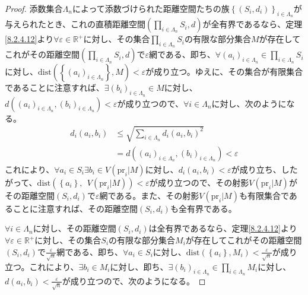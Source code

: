 \documentclass[dvipdfmx]{jsarticle}
\begin{document}
\begin{proof}
添数集合$\varLambda_{n}$によって添数づけられた距離空間たちの族$\left\{ \left( S_{i},d_{i} \right) \right\}_{i \in \varLambda_{n}}$が与えられたとき、これの直積距離空間$\left( \prod_{i \in \varLambda_{n}} S_{i},d \right)$が全有界であるなら、定理\ref{8.2.4.12}より$\forall\varepsilon \in \mathbb{R}^{+}$に対し、その集合$\prod_{i \in \varLambda_{n}} S_{i}$の有限な部分集合$M$が存在してこれがその距離空間$\left( \prod_{i \in \varLambda_{n}} S_{i},d \right)$で$\varepsilon$網である、即ち、$\forall\left( a_{i} \right)_{i \in \varLambda_{n}} \in \prod_{i \in \varLambda_{n}} S_{i}$に対し、$\mathrm{dist}\left( \left\{ \left( a_{i} \right)_{i \in \varLambda_{n}} \right\},M \right) < \varepsilon$が成り立つ。ゆえに、その集合が有限集合であることに注意すれば、$\exists\left( b_{i} \right)_{i \in \varLambda_{n}} \in M$に対し、$d\left( \left( a_{i} \right)_{i \in \varLambda_{n}},\left( b_{i} \right)_{i \in \varLambda_{n}} \right) < \varepsilon$が成り立つので、$\forall i \in \varLambda_{n}$に対し、次のようになる。
\begin{align*}
d_{i}\left( a_{i},b_{i} \right) &\leq \sqrt{\sum_{i \in \varLambda_{n}} {d_{i}\left( a_{i},b_{i} \right)}^{2}}\\
&= d\left( \left( a_{i} \right)_{i \in \varLambda_{n}},\left( b_{i} \right)_{i \in \varLambda_{n}} \right) < \varepsilon
\end{align*}
これにより、$\forall a_{i} \in S_{i}\exists b_{i} \in V\left( {\mathrm{pr}}_{i}|M \right)$に対し、$d_{i}\left( a_{i},b_{i} \right) < \varepsilon$が成り立ち、したがって、$\mathrm{dist}\left( \left\{ a_{i} \right\},\ \ V\left( {\mathrm{pr}}_{i}|M \right) \right) < \varepsilon$が成り立つので、その射影$V\left( {\mathrm{pr}}_{i}|M \right)$がその距離空間$\left( S_{i},d_{i} \right)$で$\varepsilon$網である。また、その射影$V\left( {\mathrm{pr}}_{i}|M \right)$も有限集合であることに注意すれば、その距離空間$\left( S_{i},d_{i} \right)$も全有界である。\par
$\forall i \in \varLambda_{n}$に対し、その距離空間$\left( S_{i},d_{i} \right)$は全有界であるなら、定理\ref{8.2.4.12}より$\forall\varepsilon \in \mathbb{R}^{+}$に対し、その集合$S_{i}$の有限な部分集合$M_{i}$が存在してこれがその距離空間$\left( S_{i},d_{i} \right)$で$\frac{\varepsilon}{\sqrt{n}}$網である、即ち、$\forall a_{i} \in S_{i}$に対し、$\mathrm{dist}\left( \left\{ a_{i} \right\},M_{i} \right) < \frac{\varepsilon}{\sqrt{n}}$が成り立つ。これにより、$\exists b_{i} \in M_{i}$に対し、即ち、$\exists\left( b_{i} \right)_{i \in \varLambda_{n}} \in \prod_{i \in \varLambda_{n}} M_{i}$に対し、$d\left( a_{i},b_{i} \right) < \frac{\varepsilon}{\sqrt{n}}$が成り立つので、次のようになる。

\end{proof}
\end{document}
